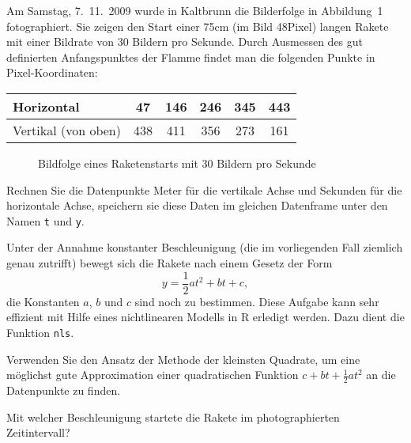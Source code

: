 Am Samstag, 7.~11.~2009 wurde in Kaltbrunn die
Bilderfolge in Abbildung~1 fotographiert. Sie zeigen den Start
einer 75cm (im Bild 48Pixel) langen Rakete mit einer Bildrate von
30 Bildern pro Sekunde.
Durch Ausmessen des gut definierten Anfangspunktes der Flamme findet
man die folgenden Punkte in Pixel-Koordinaten:
\begin{center}
\begin{tabular}{l|ccccc}
Horizontal&47&146&246&345&443\\
\hline
Vertikal (von oben)&438&411&356&273&161
\end{tabular}
\end{center}
\begin{figure}
\begin{center}
\end{center}
\caption{Bildfolge eines Raketenstarts mit 30 Bildern pro Sekunde}
\end{figure}
\begin{teilaufgaben}
\item Rechnen Sie die Datenpunkte Meter für die vertikale Achse
und Sekunden für die horizontale Achse, speichern sie diese Daten
im gleichen Datenframe unter den Namen {\tt t} und {\tt y}.
\item Unter der Annahme konstanter Beschleunigung (die im vorliegenden Fall
ziemlich genau zutrifft) bewegt sich die Rakete nach einem Gesetz
der Form
\[
y=\frac12at^2+bt+c,
\]
die Konstanten $a$, $b$ und $c$ sind noch zu bestimmen. Diese Aufgabe
kann sehr effizient mit Hilfe eines nichtlinearen Modells in R erledigt
werden. Dazu dient die Funktion {\tt nls}.
\item Verwenden Sie den Ansatz der Methode der kleinsten Quadrate, um
eine möglichst gute Approximation einer quadratischen Funktion
$c+bt+\frac12at^2$ an die Datenpunkte zu finden.
\item Mit welcher Beschleunigung startete die Rakete im photographierten
Zeitintervall?
\end{teilaufgaben}


